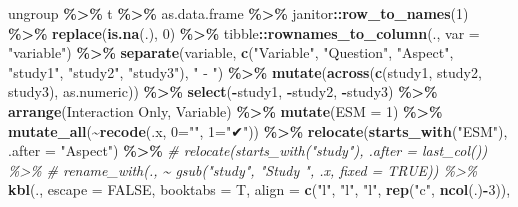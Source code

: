 \documentclass[
]{article}
\newenvironment{Shaded}{\begin{snugshade}}{\end{snugshade}}
\newcommand{\AttributeTok}[1]{\textcolor[rgb]{0.13,0.29,0.53}{#1}}
\newcommand{\CommentTok}[1]{\textcolor[rgb]{0.56,0.35,0.01}{\textit{#1}}}
\newcommand{\ConstantTok}[1]{\textcolor[rgb]{0.56,0.35,0.01}{#1}}
\newcommand{\DecValTok}[1]{\textcolor[rgb]{0.00,0.00,0.81}{#1}}
\newcommand{\FunctionTok}[1]{\textcolor[rgb]{0.13,0.29,0.53}{\textbf{#1}}}
\newcommand{\NormalTok}[1]{#1}
\newcommand{\OtherTok}[1]{\textcolor[rgb]{0.56,0.35,0.01}{#1}}
\newcommand{\SpecialCharTok}[1]{\textcolor[rgb]{0.81,0.36,0.00}{\textbf{#1}}}
\newcommand{\StringTok}[1]{\textcolor[rgb]{0.31,0.60,0.02}{#1}}
\begin{document}
\begin{Shaded}
\begin{Highlighting}[]
\NormalTok{  ungroup }\SpecialCharTok{\%\textgreater{}\%}
\NormalTok{  t }\SpecialCharTok{\%\textgreater{}\%}
\NormalTok{  as.data.frame }\SpecialCharTok{\%\textgreater{}\%}
\NormalTok{  janitor}\SpecialCharTok{::}\FunctionTok{row\_to\_names}\NormalTok{(}\DecValTok{1}\NormalTok{) }\SpecialCharTok{\%\textgreater{}\%}
  \FunctionTok{replace}\NormalTok{(}\FunctionTok{is.na}\NormalTok{(.), }\DecValTok{0}\NormalTok{) }\SpecialCharTok{\%\textgreater{}\%}
\NormalTok{  tibble}\SpecialCharTok{::}\FunctionTok{rownames\_to\_column}\NormalTok{(., }\AttributeTok{var =} \StringTok{"variable"}\NormalTok{) }\SpecialCharTok{\%\textgreater{}\%}
  \FunctionTok{separate}\NormalTok{(variable, }\FunctionTok{c}\NormalTok{(}\StringTok{"Variable"}\NormalTok{, }\StringTok{"Question"}\NormalTok{, }\StringTok{"Aspect"}\NormalTok{, }\StringTok{"study1"}\NormalTok{, }\StringTok{"study2"}\NormalTok{, }\StringTok{"study3"}\NormalTok{), }\StringTok{" {-} "}\NormalTok{) }\SpecialCharTok{\%\textgreater{}\%}
  \FunctionTok{mutate}\NormalTok{(}\FunctionTok{across}\NormalTok{(}\FunctionTok{c}\NormalTok{(study1, study2, study3), as.numeric)) }\SpecialCharTok{\%\textgreater{}\%}
  \FunctionTok{select}\NormalTok{(}\SpecialCharTok{{-}}\NormalTok{study1, }\SpecialCharTok{{-}}\NormalTok{study2, }\SpecialCharTok{{-}}\NormalTok{study3) }\SpecialCharTok{\%\textgreater{}\%}
  \FunctionTok{arrange}\NormalTok{(}\StringTok{\textasciigrave{}}\AttributeTok{Interaction Only}\StringTok{\textasciigrave{}}\NormalTok{, Variable) }\SpecialCharTok{\%\textgreater{}\%} 
  \FunctionTok{mutate}\NormalTok{(}\AttributeTok{ESM =} \DecValTok{1}\NormalTok{) }\SpecialCharTok{\%\textgreater{}\%}
  \FunctionTok{mutate\_all}\NormalTok{(}\SpecialCharTok{\textasciitilde{}}\FunctionTok{recode}\NormalTok{(.x, }\StringTok{\textasciigrave{}}\AttributeTok{0}\StringTok{\textasciigrave{}}\OtherTok{=}\StringTok{""}\NormalTok{, }\StringTok{\textasciigrave{}}\AttributeTok{ 1}\StringTok{\textasciigrave{}}\OtherTok{=}\StringTok{"✔"}\NormalTok{)) }\SpecialCharTok{\%\textgreater{}\%}
  \FunctionTok{relocate}\NormalTok{(}\FunctionTok{starts\_with}\NormalTok{(}\StringTok{"ESM"}\NormalTok{), }\AttributeTok{.after =} \StringTok{"Aspect"}\NormalTok{) }\SpecialCharTok{\%\textgreater{}\%}
  \CommentTok{\# relocate(starts\_with("study"), .after = last\_col()) \%\textgreater{}\%}
  \CommentTok{\# rename\_with(., \textasciitilde{} gsub("study", "Study ", .x, fixed = TRUE)) \%\textgreater{}\%}
  \FunctionTok{kbl}\NormalTok{(.,}
      \AttributeTok{escape =} \ConstantTok{FALSE}\NormalTok{,}
      \AttributeTok{booktabs =}\NormalTok{ T,}
      \AttributeTok{align =} \FunctionTok{c}\NormalTok{(}\StringTok{"l"}\NormalTok{, }\StringTok{"l"}\NormalTok{, }\StringTok{"l"}\NormalTok{, }\FunctionTok{rep}\NormalTok{(}\StringTok{"c"}\NormalTok{, }\FunctionTok{ncol}\NormalTok{(.)}\SpecialCharTok{{-}}\DecValTok{3}\NormalTok{)),}

\end{Highlighting}
\end{Shaded}
\end{document}
